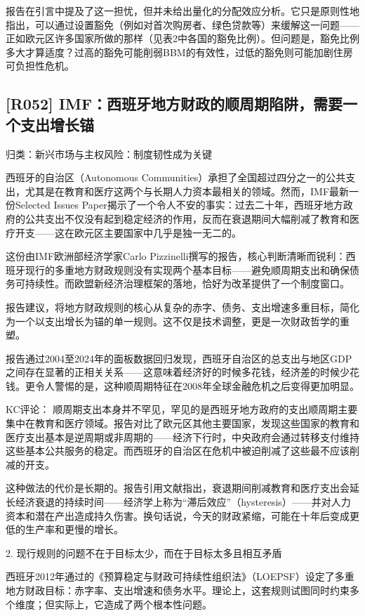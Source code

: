 \documentclass[11pt]{ctexart}
\begin{document}
报告在引言中提及了这一担忧，但并未给出量化的分配效应分析。它只是原则性地指出，可以通过设置豁免（例如对首次购房者、绿色贷款等）来缓解这一问题——正如欧元区许多国家所做的那样（见表2中各国的豁免比例）。但问题是，豁免比例多大才算适度？过高的豁免可能削弱BBM的有效性，过低的豁免则可能加剧住房可负担性危机。

\subsection{[R052] IMF：西班牙地方财政的顺周期陷阱，需要一个支出增长锚}
{\small\color{refgray}归类：新兴市场与主权风险：制度韧性成为关键}

西班牙的自治区（Autonomous Communities）承担了全国超过四分之一的公共支出，尤其是在教育和医疗这两个与长期人力资本最相关的领域。然而，IMF最新一份Selected Issues Paper揭示了一个令人不安的事实：过去二十年，西班牙地方政府的公共支出不仅没有起到稳定经济的作用，反而在衰退期间大幅削减了教育和医疗开支——这在欧元区主要国家中几乎是独一无二的。

这份由IMF欧洲部经济学家Carlo Pizzinelli撰写的报告，核心判断清晰而锐利：西班牙现行的多重地方财政规则没有实现两个基本目标——避免顺周期支出和确保债务可持续性。而欧盟新经济治理框架的落地，恰好为改革提供了一个制度窗口。

报告建议，将地方财政规则的核心从复杂的赤字、债务、支出增速多重目标，简化为一个以支出增长为锚的单一规则。这不仅是技术调整，更是一次财政哲学的重塑。

报告通过2004至2024年的面板数据回归发现，西班牙自治区的总支出与地区GDP之间存在显著的正相关关系——这意味着经济好的时候多花钱，经济差的时候少花钱。更令人警惕的是，这种顺周期特征在2008年全球金融危机之后变得更加明显。

KC评论： 顺周期支出本身并不罕见，罕见的是西班牙地方政府的支出顺周期主要集中在教育和医疗领域。报告对比了欧元区其他主要国家，发现这些国家的教育和医疗支出基本是逆周期或非周期的——经济下行时，中央政府会通过转移支付维持这些基本公共服务的稳定。而西班牙的自治区在危机中被迫削减了这些最不应该削减的开支。

这种做法的代价是长期的。报告引用文献指出，衰退期间削减教育和医疗支出会延长经济衰退的持续时间——经济学上称为“滞后效应”（hysteresis）——并对人力资本和潜在产出造成持久伤害。换句话说，今天的财政紧缩，可能在十年后变成更低的生产率和更慢的增长。

2. 现行规则的问题不在于目标太少，而在于目标太多且相互矛盾

西班牙2012年通过的《预算稳定与财政可持续性组织法》（LOEPSF）设定了多重地方财政目标：赤字率、支出增速和债务水平。理论上，这套规则试图同时约束多个维度；但实际上，它造成了两个根本性问题。
\end{document}
